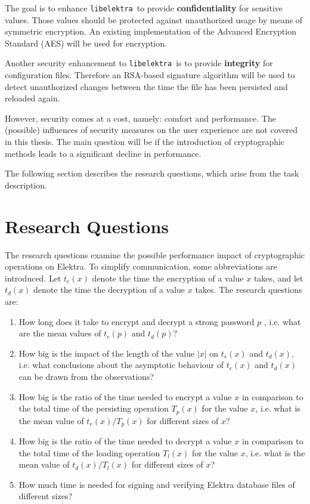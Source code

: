\documentclass[a4paper,12pt]{article}
\newcommand{\libelektra}{\texttt{libelektra}~}
\begin{document}
The goal is to enhance \libelektra to provide \textbf{confidentiality} for sensitive values.
Those values should be protected against unauthorized usage by means of symmetric encryption.
An existing implementation of the Advanced Encryption Standard (AES) will be used for encryption.

Another security enhancement to \libelektra is to provide \textbf{integrity} for configuration files.
Therefore an RSA-based signature algorithm will be used to detect unauthorized changes between the time the file has been persisted and reloaded again.

However, security comes at a cost, namely: comfort and performance. The (possible) influences of security measures on the user experience are not covered in this thesis. The main question will be if the introduction of cryptographic methods leads to a significant decline in performance.

The following section describes the research questions, which arise from the task description.


\section{Research Questions}

The research questions examine the possible performance impact of cryptographic operations on Elektra. 
To simplify communication, some abbreviations are introduced. 
Let $t_e(x)$ denote the time the encryption of a value $x$ takes, and let $t_d(x)$ denote the time the decryption of a value $x$ takes.
The research questions are:

\begin{enumerate}
\item How long does it take to encrypt and decrypt a strong password $p$ \cite{5461951,Holt:2011:IRS:2047456.2047461}, i.e. what are the mean values of $t_e(p)$ and $t_d(p)$?

\item How big is the impact of the length of the value $|x|$ on $t_e(x)$ and $t_d(x)$, i.e. what conclusions about the asymptotic behaviour of $t_e(x)$ and $t_d(x)$ can be drawn from the observations?

\item How big is the ratio of the time needed to encrypt a value $x$ in comparison to the total time of the persisting operation $T_p(x)$ for the value $x$, i.e. what is the mean value of $t_e(x)/T_p(x)$ for different sizes of $x$?

\item How big is the ratio of the time needed to decrypt a value $x$ in comparison to the total time of the loading operation $T_l(x)$ for the value $x$, i.e. what is the mean value of $t_d(x)/T_l(x)$ for different sizes of $x$?

\item How much time is needed for signing and verifying Elektra database files of different sizes?

\end{enumerate}
\end{document}
